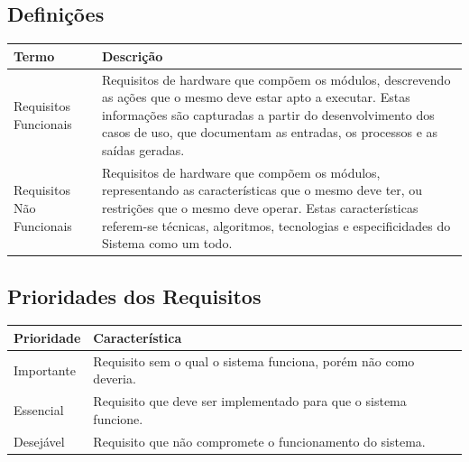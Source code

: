 \documentclass{article}
\begin{document}
  \subsection{Definições}
    \FloatBarrier
    \begin{table}[H]
      \begin{center}
        \begin{tabular}[pos]{|m{5cm} | m{9cm}|} 
          \hline
          \cellcolor[gray]{0.9}\textbf{Termo} & \cellcolor[gray]{0.9}\textbf{Descrição} \\ \hline
          Requisitos Funcionais & Requisitos de hardware que compõem os módulos, descrevendo as ações que o mesmo deve estar apto a executar. Estas informações são capturadas a partir do desenvolvimento dos casos de uso, que documentam as entradas, os processos e as saídas geradas.  \\ \hline
          Requisitos Não Funcionais & Requisitos de hardware que compõem os módulos, representando as características que o mesmo deve ter, ou restrições que o mesmo deve operar. Estas características referem-se técnicas, algoritmos, tecnologias e especificidades do Sistema como um todo.  \\ \hline
        \end{tabular}
      \end{center}
    \end{table}  

        
  \subsection{Prioridades dos Requisitos}
    \FloatBarrier
    \begin{table}[H]
      \begin{center}
        \begin{tabular}[pos]{|m{2cm} | m{12cm}|} 
          \hline
          \cellcolor[gray]{0.9}\textbf{Prioridade} & \cellcolor[gray]{0.9}\textbf{Característica} \\ \hline
          Importante      & Requisito sem o qual o sistema funciona, porém não como deveria.  \\ \hline
          Essencial       & Requisito que deve ser implementado para que o sistema funcione.  \\ \hline
          Desejável       & Requisito que não compromete o funcionamento do sistema.  \\ \hline
        \end{tabular}
      \end{center}
    \end{table}  
  
\end{document}
